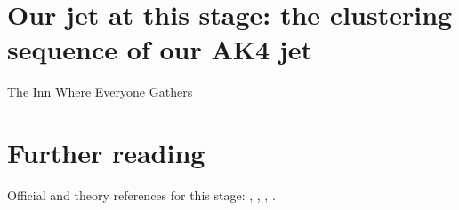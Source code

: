 \section{Our jet at this stage: the clustering sequence of our AK4 jet}
\label{sec:the_inn:our_jet_at_this_stage_the_clustering_seq}

\begin{ledger}{The Inn Where Everyone Gathers}
\end{ledger}

\section{Further reading}
\label{sec:the_inn:further_reading}
Official and theory references for this stage: \cite{Cacciari:2008gp}, \cite{Cacciari:2011ma}, \cite{Salam:2009jx}, \cite{Cacciari:2008gn}.

\begin{pitfalls}
\end{pitfalls}

\begin{exercises}
\item {}
\item {}
\end{exercises}
